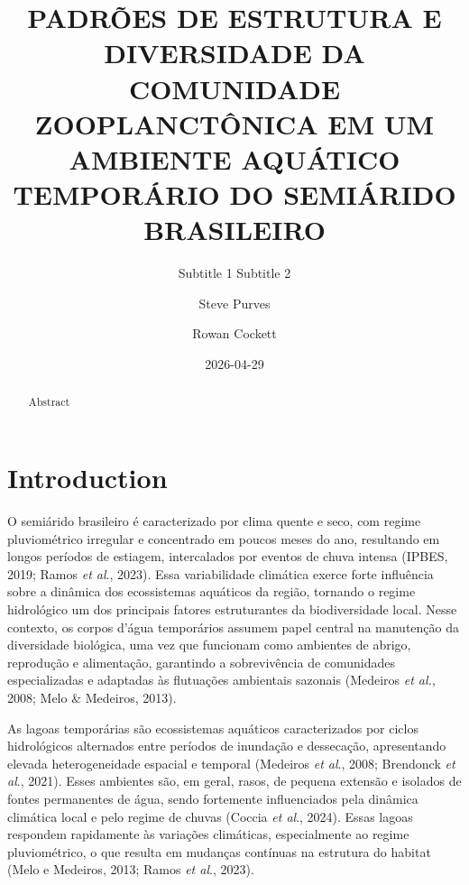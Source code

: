 \documentclass[
  american,
  letterpaper,
  DIV=11,
  numbers=noendperiod]{scrartcl}
\title{PADRÕES DE ESTRUTURA E DIVERSIDADE DA COMUNIDADE ZOOPLANCTÔNICA
EM UM AMBIENTE AQUÁTICO TEMPORÁRIO DO SEMIÁRIDO BRASILEIRO}
\subtitle{Subtitle 1 Subtitle 2}
\author{Steve Purves \and Rowan Cockett}
\date{2026-04-29}
\renewcommand*\contentsname{Table of contents}
\newcommand\contentsname{Table of contents}
\begin{document}
\maketitle
\begin{abstract}
Abstract
\end{abstract}

\renewcommand*\contentsname{Table of contents}
{
\hypersetup{linkcolor=}
\setcounter{tocdepth}{3}
\tableofcontents
}
\listoffigures
\listoftables

\section{Introduction}\label{introduction}

O semiárido brasileiro é caracterizado por clima quente e seco, com
regime pluviométrico irregular e concentrado em poucos meses do ano,
resultando em longos períodos de estiagem, intercalados por eventos de
chuva intensa (IPBES, 2019; Ramos \emph{et al}., 2023). Essa
variabilidade climática exerce forte influência sobre a dinâmica dos
ecossistemas aquáticos da região, tornando o regime hidrológico um dos
principais fatores estruturantes da biodiversidade local. Nesse
contexto, os corpos d'água temporários assumem papel central na
manutenção da diversidade biológica, uma vez que funcionam como
ambientes de abrigo, reprodução e alimentação, garantindo a
sobrevivência de comunidades especializadas e adaptadas às flutuações
ambientais sazonais (Medeiros \emph{et al.}, 2008; Melo \& Medeiros,
2013).

As lagoas temporárias são ecossistemas aquáticos caracterizados por
ciclos hidrológicos alternados entre períodos de inundação e dessecação,
apresentando elevada heterogeneidade espacial e temporal (Medeiros
\emph{et al}., 2008; Brendonck \emph{et al}., 2021). Esses ambientes
são, em geral, rasos, de pequena extensão e isolados de fontes
permanentes de água, sendo fortemente influenciados pela dinâmica
climática local e pelo regime de chuvas (Coccia \emph{et al}., 2024).
Essas lagoas respondem rapidamente às variações climáticas,
especialmente ao regime pluviométrico, o que resulta em mudanças
contínuas na estrutura do habitat (Melo e Medeiros, 2013; Ramos \emph{et
al}., 2023).
\end{document}
